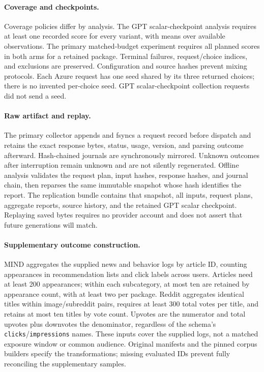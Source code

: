 \paragraph{Coverage and checkpoints.}
Coverage policies differ by analysis. The GPT scalar-checkpoint analysis requires at least
one recorded score for every variant, with means over available observations. The primary
matched-budget experiment requires all planned scores in both arms for a retained package. Terminal failures,
request/choice indices, and exclusions are preserved. Configuration and source hashes prevent
mixing protocols. Each Azure request has one seed shared by its three returned choices; there
is no invented per-choice seed. GPT scalar-checkpoint collection requests did not send a seed.

\paragraph{Raw artifact and replay.}
The primary collector appends and fsyncs a request record before dispatch and retains the exact
response bytes, status, usage, version, and parsing outcome afterward. Hash-chained journals
are synchronously mirrored. Unknown outcomes after interruption remain unknown and are not
silently regenerated. Offline analysis validates the request plan, input hashes, response hashes,
and journal chain, then reparses the same immutable snapshot whose hash identifies the report.
The replication bundle contains that snapshot, all inputs, request plans, aggregate reports,
source history, and the retained GPT scalar checkpoint. Replaying saved bytes
requires no provider account and does not assert that future generations will match.

\paragraph{Supplementary outcome construction.}
MIND aggregates the supplied news and behavior logs by article ID, counting appearances in
recommendation lists and click labels across users. Articles need at least 200 appearances;
within each subcategory, at most ten are retained by appearance count, with at least two per
package. Reddit aggregates identical titles within image/subreddit pairs, requires at least
300 total votes per title, and retains at most ten titles by vote count. Upvotes are the
numerator and total upvotes plus downvotes the denominator, regardless of the schema's
\texttt{clicks}/\texttt{impressions} names. These inputs cover the supplied logs, not a matched
exposure window or common audience. Original manifests and the pinned corpus builders specify
the transformations; missing evaluated IDs prevent fully reconciling the supplementary samples.

